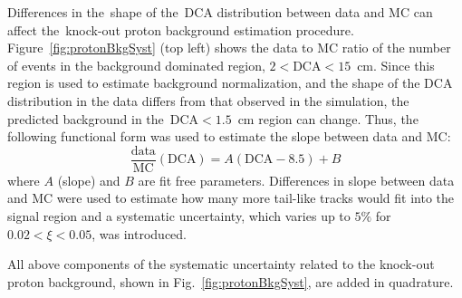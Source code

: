 Differences in the~shape of the~$\textrm{DCA}$ distribution between data and \ac{MC} can affect the~knock-out proton background estimation procedure. Figure~\ref{fig:protonBkgSyst} (top left) shows the data to MC ratio of  the  number of events in the background dominated region, $2<\textrm{DCA}<15$~cm. 
Since this region is used to estimate background normalization, and the shape of the $\textrm{DCA}$ distribution in the data differs from that observed in the simulation, the predicted background in the~$\textrm{DCA} <1.5$~cm region can change. Thus, the following functional form was used to estimate the slope between data and MC:
\begin{equation}
\frac{\textrm{data}}{\textrm{MC}}\left(\textrm{DCA}\right) = A(\textrm{DCA}-8.5)+B
\label{eq:slopeBkgFit}
\end{equation}
where $A$ (slope) and  $B$ are fit free parameters. Differences in slope between data and \ac{MC} were used to estimate how many
more tail-like tracks would fit into the signal region and a systematic uncertainty, which varies up to $5\%$ for $0.02< \xi<0.05$, was introduced. 




All above components of the systematic uncertainty related to the knock-out proton background,  shown in Fig.~\ref{fig:protonBkgSyst}, are added in quadrature.
 
 
 


 
 \FloatBarrier